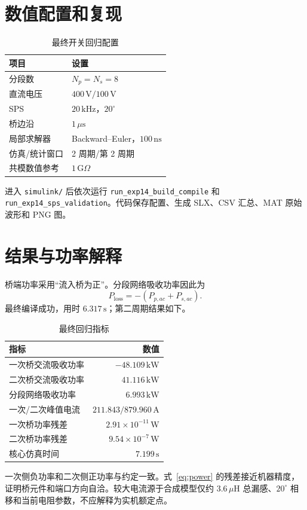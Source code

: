 \documentclass[11pt,a4paper]{ctexart}
\begin{document}
\section{数值配置和复现}
\begin{table}[H]
\centering
\caption{最终开关回归配置}
\begin{tabular}{ll}
\toprule
项目 & 设置\\
\midrule
分段数 & $N_p=N_s=8$\\
直流电压 & $400\,\mathrm{V}/100\,\mathrm{V}$\\
SPS & $20\,\mathrm{kHz}$，$20^\circ$\\
桥边沿 & $1\,\mu\mathrm{s}$\\
局部求解器 & Backward--Euler，$100\,\mathrm{ns}$\\
仿真/统计窗口 & 2 周期/第 2 周期\\
共模数值参考 & $1\,\mathrm{G}\Omega$\\
\bottomrule
\end{tabular}
\end{table}
进入 \texttt{simulink/} 后依次运行 \texttt{run\_exp14\_build\_compile} 和 \texttt{run\_exp14\_sps\_validation}。代码保存配置、生成 SLX、CSV 汇总、MAT 原始波形和 PNG 图。

\section{结果与功率解释}
桥端功率采用“流入桥为正”。分段网络吸收功率因此为
\begin{equation}
P_{\mathrm{loss}}=-(P_{p,ac}+P_{s,ac}).
\end{equation}
最终编译成功，用时 $6.317\,\mathrm{s}$；第二周期结果如下。
\begin{table}[H]
\centering
\caption{最终回归指标}
\begin{tabular}{lr}
\toprule
指标 & 数值\\
\midrule
一次桥交流吸收功率 & $-48.109\,\mathrm{kW}$\\
二次桥交流吸收功率 & $41.116\,\mathrm{kW}$\\
分段网络吸收功率 & $6.993\,\mathrm{kW}$\\
一次/二次峰值电流 & $211.843/879.960\,\mathrm{A}$\\
一次桥功率残差 & $2.91\times10^{-11}\,\mathrm{W}$\\
二次桥功率残差 & $9.54\times10^{-7}\,\mathrm{W}$\\
核心仿真时间 & $7.199\,\mathrm{s}$\\
\bottomrule
\end{tabular}
\end{table}
一次侧负功率和二次侧正功率与约定一致。式~\eqref{eq:power} 的残差接近机器精度，证明桥元件和端口方向自洽。较大电流源于合成模型仅约 $3.6\,\mu\mathrm{H}$ 总漏感、$20^\circ$ 相移和当前电阻参数，不应解释为实机额定点。
\end{document}

